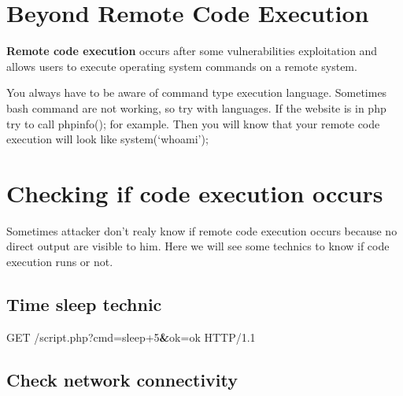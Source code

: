 \documentclass{assets/ipesethesis}
\newenvironment{Shaded}{\begin{snugshade}}{\end{snugshade}}
\newcommand{\ExtensionTok}[1]{#1}
\newcommand{\KeywordTok}[1]{\textcolor[rgb]{0.13,0.29,0.53}{\textbf{#1}}}
\newcommand{\NormalTok}[1]{#1}
\newcommand{\VariableTok}[1]{\textcolor[rgb]{0.00,0.00,0.00}{#1}}
\begin{document}
\hypertarget{beyond-remote-code-execution}{%
\chapter*{Beyond Remote Code Execution}\label{beyond-remote-code-execution}}

\textbf{Remote code execution} occurs after some vulnerabilities exploitation and allows users to execute
operating system commands on a remote system.

You always have to be aware of command type execution language. Sometimes bash command are not working, so try with
languages. If the website is in php try to call phpinfo(); for example. Then you will know that your remote code execution will
look like system(`whoami');

\hypertarget{checking-if-code-execution-occurs}{%
\chapter*{Checking if code execution occurs}\label{checking-if-code-execution-occurs}}

Sometimes attacker don't realy know if remote code execution occurs because no direct output are visible
to him. Here we will see some technics to know if code execution runs or not.

\hypertarget{time-sleep-technic}{%
\section*{Time sleep technic}\label{time-sleep-technic}}

\begin{Shaded}
\begin{Highlighting}[]
\ExtensionTok{GET}\NormalTok{ /script.php?cmd=sleep+5}\KeywordTok{&}\VariableTok{ok=}\NormalTok{ok }\ExtensionTok{HTTP/1.1}
\end{Highlighting}
\end{Shaded}

\hypertarget{check-network-connectivity}{%
\section*{Check network connectivity}\label{check-network-connectivity}}
\end{document}
